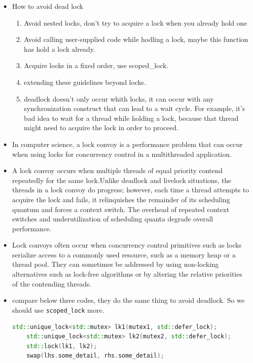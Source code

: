 \documentclass[a4paper,11pt,twoside]{book}
\begin{document}
\begin{itemize}
	
	\item How to avoid dead lock
	\begin{enumerate}
		\item Avoid nested locks, don't try to acquire a lock when you already hold one
		\item Avoid calling user-supplied code while hodling a lock, maybe this function has hold a lock already.
		\item Acquire locks in a fixed order, use scoped\_lock.
		\item extending these guidelines beyond locks. 
		\item deadlock doesn't only occur whith locks, it can occur with any synchronization construct that can lead to a wait cycle. For example, it's bad idea to wait for a thread while holding a lock, because that thread might need to acquire the lock in order to proceed. 
	\end{enumerate}	
	
	\item In computer science, a lock convoy is a performance problem that can occur when using locks for concurrency control in a multithreaded application.
	
	\item A lock convoy occurs when multiple threads of equal priority contend repeatedly for the same lock.Unlike deadlock and livelock situations, the threads in a lock convoy do progress; however, each time a thread attempts to acquire the lock and fails, it relinquishes the remainder of its scheduling quantum and forces a context switch. The overhead of repeated context switches and underutilization of scheduling quanta degrade overall performance.
	
	\item Lock convoys often occur when concurrency control primitives such as locks serialize access to a commonly used resource, such as a memory heap or a thread pool. They can sometimes be addressed by using non-locking alternatives such as lock-free algorithms or by altering the relative priorities of the contending threads.
	
	\item compare below three codes, they do the same thing to avoid deadlock. So we should use \texttt{scoped\_lock} more. 
\begin{lstlisting}[frame=single, language=c++]
	std::unique_lock<std::mutex> lk1(mutex1, std::defer_lock);
	std::unique_lock<std::mutex> lk2(mutex2, std::defer_lock);
	std::lock(lk1, lk2);	
	swap(lhs.some_detail, rhs.some_detail);
\end{lstlisting}


\end{itemize}
\end{document}
